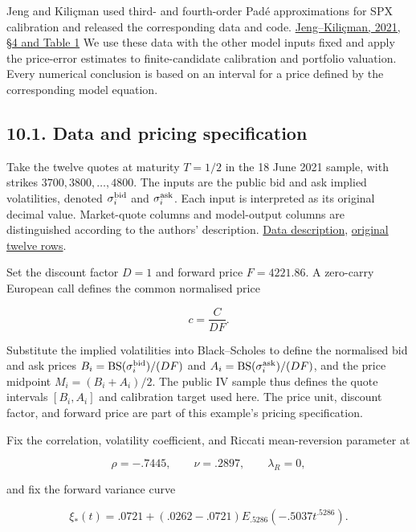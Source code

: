 \documentclass[a4paper,11pt]{article}
\begin{document}
Jeng and Kiliçman used third- and fourth-order Padé approximations for SPX calibration and released the corresponding data and code. \href{https://www.mdpi.com/2227-7390/9/21/2675}{Jeng–Kiliçman, 2021, §4 and Table 1} We use these data with the other model inputs fixed and apply the price-error estimates to finite-candidate calibration and portfolio valuation. Every numerical conclusion is based on an interval for a price defined by the corresponding model equation.

\subsection*{10.1. Data and pricing specification}

Take the twelve quotes at maturity $T=1/2$ in the 18 June 2021 sample, with strikes $3700,3800,\ldots,4800$. The inputs are the public bid and ask implied volatilities, denoted $\sigma_i^{\rm bid}$ and $\sigma_i^{\rm ask}$. Each input is interpreted as its original decimal value. Market-quote columns and model-output columns are distinguished according to the authors' description. \href{https://github.com/WoonJeng/Dataset-for-SPX-Calibration-of-Option-Approximations-under-Rough-Heston-model/blob/860049da2b7486fe8aa509061eff23cc28c2ef89/README.md}{Data description}, \href{https://github.com/WoonJeng/Dataset-for-SPX-Calibration-of-Option-Approximations-under-Rough-Heston-model/blob/860049da2b7486fe8aa509061eff23cc28c2ef89/spx_decomp.csv}{original twelve rows}.

Set the discount factor $D=1$ and forward price $F=4221.86$. A zero-carry European call defines the common normalised price

\[
c=\frac{C}{DF}.
\tag{U1}
\]

Substitute the implied volatilities into Black–Scholes to define the normalised bid and ask prices
$B_i=\operatorname{BS}(\sigma_i^{\rm bid})/(DF)$ and $A_i=\operatorname{BS}(\sigma_i^{\rm ask})/(DF)$, and the price midpoint $M_i=(B_i+A_i)/2$. The public IV sample thus defines the quote intervals $[B_i,A_i]$ and calibration target used here. The price unit, discount factor, and forward price are part of this example's pricing specification.

Fix the correlation, volatility coefficient, and Riccati mean-reversion parameter at

\[
\rho=-.7445,\qquad \nu=.2897,\qquad \lambda_R=0,
\]

and fix the forward variance curve

\[
\xi_*(t)=.0721+(.0262-.0721)
E_{.5286}(-.5037t^{.5286}).
\tag{U2}
\]
\end{document}
